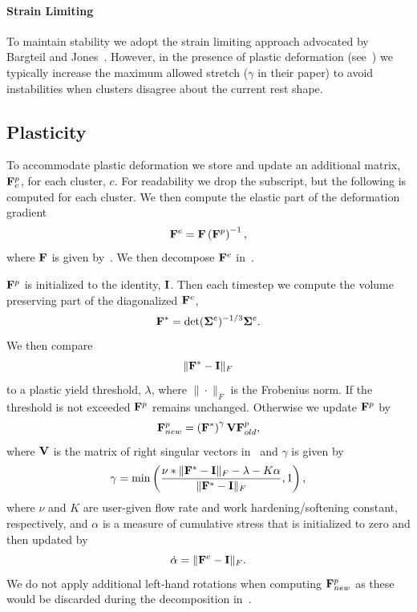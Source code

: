 \documentclass[review]{acmsiggraph}
\begin{document}
\paragraph{Strain Limiting}
To maintain stability we adopt the strain limiting approach advocated by Bargteil and Jones~.
However, in the presence of plastic deformation (see~) we typically increase the maximum allowed stretch ($\gamma$ in
their paper) to avoid instabilities when clusters disagree about the current rest shape.

\subsection{Plasticity}
\label{sec:Plasticity}
To accommodate plastic deformation we store and update an additional matrix, $\mathit{\mathbf{F}}^p_c$, for each cluster, $c$.
For readability we drop the subscript, but the following is computed for each cluster.
We then compute the elastic part of the deformation gradient
\begin{equation}
\mathit{\mathbf{F}}^e = \mathit{\mathbf{F}} \left(\mathit{\mathbf{F}}^p\right)^{-1},
\end{equation}
where $\mathit{\mathbf{F}}$ is given by~.  We then decompose $\mathit{\mathbf{F}}^e$ in~.

$\mathit{\mathbf{F}}^p$ is initialized to the identity, $\mathit{\mathbf{I}}$.  Then each timestep we compute the volume preserving part 
of the diagonalized $\mathit{\mathbf{F}}^e$,
\begin{equation}
\mathit{\mathbf{F}}^* = \det(\mathit{\mathbf{\Sigma}}^e)^{-1/3}\mathit{\mathbf{\Sigma}}^e.
\end{equation}
We then compare
\begin{equation}
\|\mathit{\mathbf{F}}^* - \mathit{\mathbf{I}}\|_F
\end{equation}
to a plastic yield threshold, $\lambda$, where $\|\cdot\|_F$ is the Frobenius norm.  If the threshold
is not exceeded $\mathit{\mathbf{F}}^p$ remains unchanged.  Otherwise we update $\mathit{\mathbf{F}}^p$ by
\begin{equation}
\mathit{\mathbf{F}}^p_{new} = \left(\mathit{\mathbf{F}}^*\right)^\gamma\mathit{\mathbf{V}}\mathit{\mathbf{F}}^p_{old},
\end{equation}
where $\mathit{\mathbf{V}}$ is the matrix of right singular vectors in~ and $\gamma$ is given by
\begin{equation}
\gamma = \min\left(\frac{\nu * \|\mathit{\mathbf{F}}^* - \mathit{\mathbf{I}}\|_F - \lambda - K\alpha}{\|\mathit{\mathbf{F}}^* - \mathit{\mathbf{I}}\|_F},1\right),
\end{equation}
where $\nu$ and $K$ are user-given flow rate and work hardening/softening constant, respectively, 
and $\alpha$ is a measure of cumulative stress that is initialized to zero and then updated by
\begin{equation}
\dot{\alpha} = \|\mathit{\mathbf{F}}^e-\mathit{\mathbf{I}}\|_F.
\end{equation}
We do not apply additional left-hand rotations when computing $\mathit{\mathbf{F}}^p_{new}$ as these would be discarded during
the decomposition in~.
\end{document}
